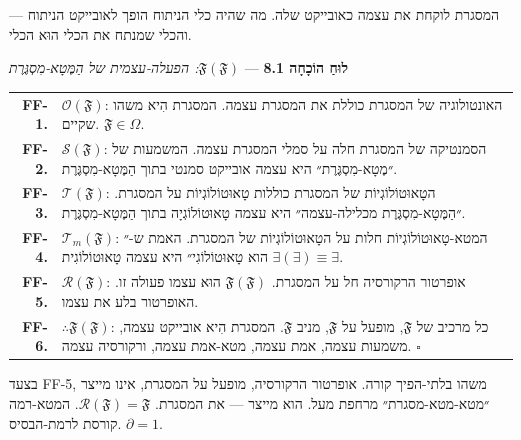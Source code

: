 \documentclass[10pt, openany, oneside]{book}
\renewcommand{\footnotesize}{\fontsize{8.5}{11}\selectfont}
\begin{document}
המסגרת לוקחת את עצמה כאובייקט שלה. מה שהיה כלי הניתוח הופך לאובייקט הניתוח — והכלי שמנתח את הכלי הוּא הכלי.

\vspace{0.5em}

\textbf{לוּחַ הוֹכָחָה 8.1} --- \textit{$\mathfrak{F}(\mathfrak{F})$: הפעלה-עצמית של הַמֶּטָא-מִסְגֶּרֶת}

\vspace{0.5em}

{\footnotesize
\noindent\begin{tabular}{r p{}}
\textbf{FF-1.} & $\mathcal{O}(\mathfrak{F})$: האונטולוגיה של המסגרת כוללת את המסגרת עצמה. המסגרת הִיא משהו שקיים. $\mathfrak{F} \in \Omega$. \\[0.3em]
\textbf{FF-2.} & $\mathcal{S}(\mathfrak{F})$: הסמנטיקה של המסגרת חלה על סמלי המסגרת עצמה. המשמעות של ״מֶטָא-מִסְגֶּרֶת״ היא עצמה אובייקט סמנטי בתוך הַמֶּטָא-מִסְגֶּרֶת. \\[0.3em]
\textbf{FF-3.} & $\mathcal{T}(\mathfrak{F})$: הטָאוּטוֹלוֹגְיוֹת של המסגרת כוללות טָאוּטוֹלוֹגְיוֹת על המסגרת. ״הַמֶּטָא-מִסְגֶּרֶת מכלילה-עצמה״ היא עצמה טָאוּטוֹלוֹגְיָה בתוך הַמֶּטָא-מִסְגֶּרֶת. \\[0.3em]
\textbf{FF-4.} & $\mathcal{T}_m(\mathfrak{F})$: המטא-טָאוּטוֹלוֹגְיוֹת חלות על הטָאוּטוֹלוֹגְיוֹת של המסגרת. האמת ש-״$\exists(\exists) \equiv \exists$ הוא טָאוּטוֹלוֹגִי״ היא עצמה טָאוּטוֹלוֹגִית. \\[0.3em]
\textbf{FF-5.} & $\mathcal{R}(\mathfrak{F})$: אופרטור הרקורסיה חל על המסגרת. $\mathfrak{F}(\mathfrak{F})$ הוּא עצמו פעולה זו. האופרטור בלע את עצמו. \\[0.3em]
\textbf{FF-6.} & $\therefore \mathfrak{F}(\mathfrak{F})$: כל מרכיב של $\mathfrak{F}$, מופעל על $\mathfrak{F}$, מניב $\mathfrak{F}$. המסגרת הִיא אובייקט עצמה, משמעות עצמה, אמת עצמה, מטא-אמת עצמה, ורקורסיה עצמה. $\square$ \\[0.3em]
\end{tabular}
}

\vspace{0.8em}

\noindent בצעד FF-5, משהו בלתי-הפיך קורה. אופרטור הרקורסיה, מופעל על המסגרת, אינו מייצר ״מטא-מטא-מסגרת״ מרחפת מעל. הוא מייצר — את המסגרת. $\mathcal{R}(\mathfrak{F}) = \mathfrak{F}$. המטא-רמה קורסת לרמת-הבסיס. $\partial = 1$.

\vspace{1.5em}

\end{document}
